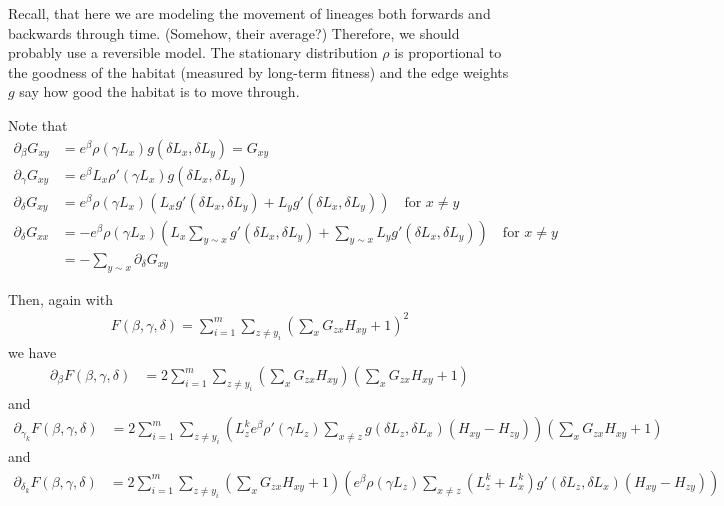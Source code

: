 \documentclass{article}
\begin{document}
Recall, that here we are modeling the movement of lineages both forwards and backwards through time.
(Somehow, their average?)
Therefore, we should probably use a reversible model.
The stationary distribution $\rho$ is proportional to the goodness of the habitat
(measured by long-term fitness)
and the edge weights $g$ say how good the habitat is to move through.

Note that
\begin{align}
  \partial_\beta G_{xy} &= e^\beta \rho( \gamma L_x ) g( \delta L_x, \delta L_y )  = G_{xy}\\
  \partial_\gamma G_{xy} &= e^\beta L_x \rho'( \gamma L_x ) g( \delta L_x, \delta L_y ) \\
  \partial_\delta G_{xy} &= e^\beta \rho( \gamma L_x ) \left( L_x g'( \delta L_x, \delta L_y )  + L_y g'( \delta L_x, \delta L_y ) \right ) 
      \quad \text{for } x \neq y \\
  \partial_\delta G_{xx} &=  - e^\beta \rho( \gamma L_x ) \left( L_x \sum_{y \sim x} g'(\delta L_x, \delta L_y) + \sum_{y \sim x} L_y g'( \delta L_x, \delta L_y ) \right) \quad \text{for } x \neq y \\
      &= - \sum_{y \sim x} \partial_\delta G_{xy} 
\end{align}

Then, again with
\begin{align}
  F(\beta,\gamma,\delta) = \sum_{i=1}^m \sum_{z \neq y_i} \left( \sum_x G_{zx} H_{xy} + 1 \right)^2 
\end{align}
we have
\begin{align}
    \partial_\beta F(\beta,\gamma,\delta) &= 2 \sum_{i=1}^m \sum_{z \neq y_i} \left( \sum_x G_{zx} H_{xy} \right)\left( \sum_x G_{zx} H_{xy} + 1 \right)
\end{align}
and
\begin{align}
  \partial_{\gamma_k} F(\beta,\gamma,\delta) &= 2 \sum_{i=1}^m \sum_{z \neq y_i} \left( L^k_z e^\beta \rho'(\gamma L_z) \sum_{x \neq z} g(\delta L_z, \delta L_x) (H_{xy}-H_{zy}) \right) \left( \sum_x G_{zx} H_{xy} + 1 \right)  
\end{align}
and
\begin{align}
  \partial_{\delta_k} F(\beta,\gamma,\delta) &= 2 \sum_{i=1}^m \sum_{z \neq y_i} 
    \left( \sum_x G_{zx} H_{xy} + 1 \right) 
  \left( e^\beta \rho(\gamma L_z) 
    \sum_{x \neq z} (L^k_z + L^k_x) g'(\delta L_z, \delta L_x) ( H_{xy} - H_{zy} ) 
  \right) 
\end{align}
\end{document}
